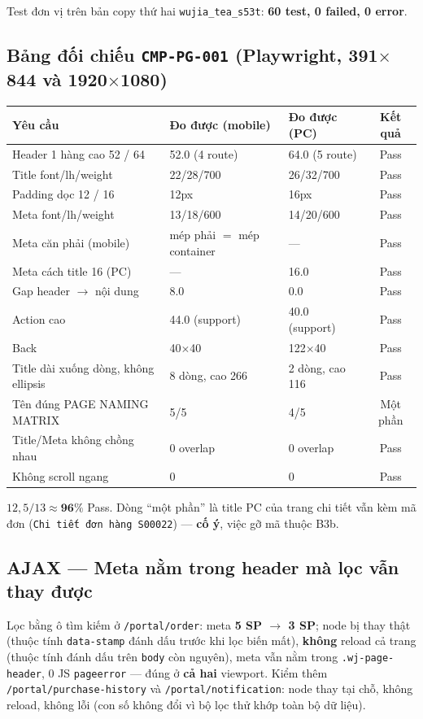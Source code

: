 Test đơn vị trên bản copy thứ hai \texttt{wujia\_tea\_s53t}: \textbf{60 test, 0 failed, 0
error}.

\subsection{Bảng đối chiếu \texttt{CMP-PG-001} (Playwright, 391$\times$844 và 1920$\times$1080)}

\begin{center}
\begin{tabular}{lllc}
\hline
Yêu cầu & Đo được (mobile) & Đo được (PC) & Kết quả \\
\hline
Header 1 hàng cao 52 / 64 & 52.0 (4 route) & 64.0 (5 route) & Pass \\
Title font/lh/weight & 22/28/700 & 26/32/700 & Pass \\
Padding dọc 12 / 16 & 12px & 16px & Pass \\
Meta font/lh/weight & 13/18/600 & 14/20/600 & Pass \\
Meta căn phải (mobile) & mép phải $=$ mép container & --- & Pass \\
Meta cách title 16 (PC) & --- & 16.0 & Pass \\
Gap header $\rightarrow$ nội dung & 8.0 & 0.0 & Pass \\
Action cao & 44.0 (support) & 40.0 (support) & Pass \\
Back & 40$\times$40 & 122$\times$40 & Pass \\
Title dài xuống dòng, không ellipsis & 8 dòng, cao 266 & 2 dòng, cao 116 & Pass \\
Tên đúng PAGE NAMING MATRIX & 5/5 & 4/5 & Một phần \\
Title/Meta không chồng nhau & 0 overlap & 0 overlap & Pass \\
Không scroll ngang & 0 & 0 & Pass \\
\hline
\end{tabular}
\end{center}

$12{,}5/13 \approx \mathbf{96\%}$ Pass. Dòng ``một phần'' là title PC của trang chi tiết vẫn
kèm mã đơn (\texttt{Chi tiết đơn hàng S00022}) --- \textbf{cố ý}, việc gỡ mã thuộc B3b.

\subsection{AJAX --- Meta nằm trong header mà lọc vẫn thay được}

Lọc bằng ô tìm kiếm ở \texttt{/portal/order}: meta \textbf{5 SP $\rightarrow$ 3 SP}; node bị
thay thật (thuộc tính \texttt{data-stamp} đánh dấu trước khi lọc biến mất), \textbf{không}
reload cả trang (thuộc tính đánh dấu trên \texttt{body} còn nguyên), meta vẫn nằm trong
\texttt{.wj-page-header}, 0 JS \texttt{pageerror} --- đúng ở \textbf{cả hai} viewport. Kiểm
thêm \texttt{/portal/purchase-history} và \texttt{/portal/notification}: node thay tại chỗ,
không reload, không lỗi (con số không đổi vì bộ lọc thử khớp toàn bộ dữ liệu).

